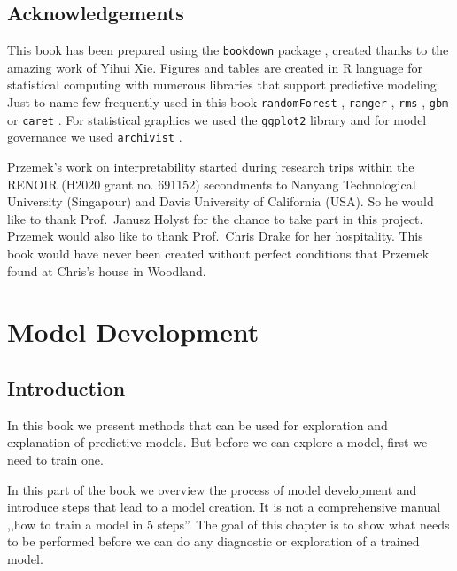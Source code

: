\documentclass[]{krantz}
\begin{document}
\hypertarget{thanksto}{%
\section{Acknowledgements}\label{thanksto}}

This book has been prepared using the \texttt{bookdown} package \citep{R-bookdown}, created thanks to the amazing work of Yihui Xie.
Figures and tables are created in R language for statistical computing \citep{RcoreT} with numerous libraries that support predictive modeling. Just to name few frequently used in this book \texttt{randomForest} \citep{randomForest}, \texttt{ranger} \citep{rangerRpackage}, \texttt{rms} \citep{rms}, \texttt{gbm} \citep{gbm} or \texttt{caret} \citep{caret}. For statistical graphics we used the \texttt{ggplot2} library \citep{ggplot2} and for model governance we used \texttt{archivist} \citep{archivist}.

Przemek's work on interpretability started during research trips within the RENOIR (H2020 grant no. 691152) secondments to Nanyang Technological University (Singapour) and Davis University of California (USA). So he would like to thank Prof.~Janusz Holyst for the chance to take part in this project. Przemek would also like to thank Prof.~Chris Drake for her hospitality. This book would have never been created without perfect conditions that Przemek found at Chris's house in Woodland.

\hypertarget{modelDevelopmentProcess}{%
\chapter{Model Development}\label{modelDevelopmentProcess}}

\hypertarget{MDPIntro}{%
\section{Introduction}\label{MDPIntro}}

In this book we present methods that can be used for exploration and explanation of predictive models. But before we can explore a model, first we need to train one.

In this part of the book we overview the process of model development and introduce steps that lead to a model creation. It is not a comprehensive manual ,,how to train a model in 5 steps''. The goal of this chapter is to show what needs to be performed before we can do any diagnostic or exploration of a trained model.
\end{document}
